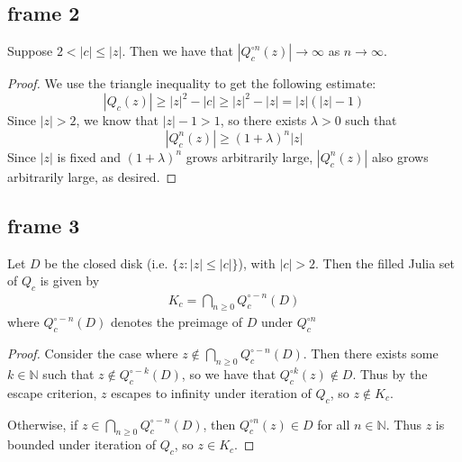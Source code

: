 \documentclass[xcolor=x11names,compress]{beamer}
\renewcommand{\(}{\begin{columns}}
\renewcommand{\)}{\end{columns}}
\newcommand{\<}[1]{\begin{column}{#1}}
\renewcommand{\>}{\end{column}}
\begin{document}
\subsection{frame 2}
\begin{frame}

\begin{theorem} 
Suppose $2 < |c| \le |z|$. Then we have that $|Q_c^{\circ n}(z)| \rightarrow \infty$ as $n \rightarrow \infty$.
\end{theorem}

\begin{proof}
We use the triangle inequality to get the following estimate:
\begin{equation}
    |Q_c(z)| \geq |z|^2 - |c| \geq |z|^2 - |z| = |z|(|z|-1)
\end{equation}
Since $|z| > 2$, we know that $|z|-1>1$, so there exists $\lambda > 0$ such that 
\begin{equation}
    |Q_c^n(z)| \geq (1+\lambda)^n|z|
\end{equation}
Since $|z|$ is fixed and $(1+\lambda)^n$ grows arbitrarily large, $|Q_c^n(z)|$ also grows arbitrarily large, as desired.
\end{proof}

\end{frame}

\subsection{frame 3}
\begin{frame}

\begin{theorem}
Let $D$ be the closed disk (i.e. $\{z : |z| \le |c|\}$), with $|c|>2$. Then the filled Julia set of $Q_c$ is given by
\begin{align*}
K_c = \bigcap\limits_{n\ge 0} Q_c^{\circ -n} (D)
\end{align*}
where $Q_c^{\circ -n} (D)$ denotes the preimage of $D$ under $Q_c^{\circ n}$
\end{theorem}

\begin{proof}
    Consider the case where
    $z\notin \bigcap_{n\ge 0} Q_c^{\circ -n} (D)$.
    Then there exists some $k\in \mathbb{N}$ such that $z\notin Q_c^{\circ -k} (D)$,
    so we have that $Q_c^{\circ k}(z) \notin D$. 
    Thus by the escape criterion, $z$ escapes to infinity under iteration
    of $Q_c$, so $z\notin K_c$.  

    Otherwise, if $z\in \bigcap_{n\ge 0} Q_c^{\circ -n} (D)$, then 
     $Q_c^{\circ n}(z) \in D$ for all $n\in \mathbb{N}$. Thus $z$ is bounded under
     iteration of $Q_c$, so $z\in K_c$.
\end{proof}
\end{frame}
\end{document}
